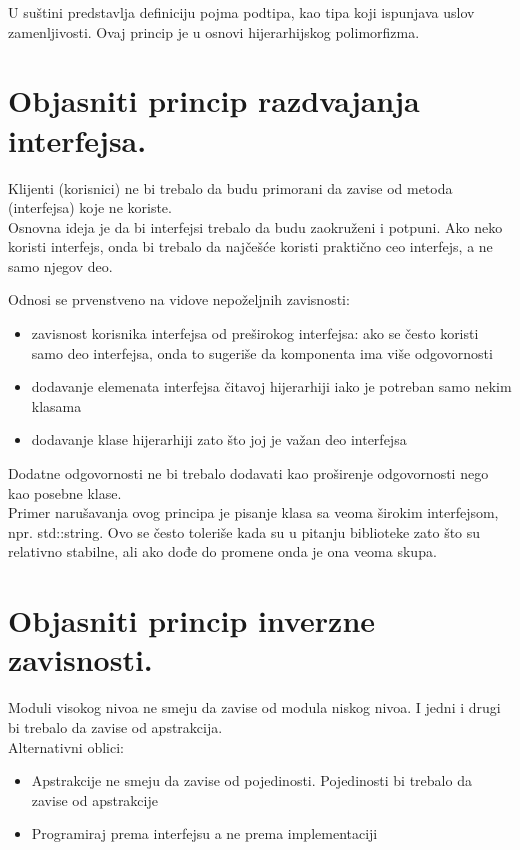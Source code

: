\documentclass[a4paper]{article}
\begin{document}
U suštini predstavlja definiciju pojma podtipa, kao tipa koji ispunjava uslov zamenljivosti. Ovaj princip je u osnovi hijerarhijskog polimorfizma.

\section{Objasniti princip razdvajanja interfejsa.}
Klijenti (korisnici) ne bi trebalo da budu primorani da zavise od metoda (interfejsa) koje ne koriste.\\

Osnovna ideja je da bi interfejsi trebalo da budu zaokruženi i potpuni. Ako neko koristi interfejs, onda bi trebalo da najčešće koristi praktično ceo interfejs, a ne samo njegov deo.

Odnosi se prvenstveno na vidove nepoželjnih zavisnosti:
\begin{itemize}
   \item zavisnost korisnika interfejsa od preširokog interfejsa: ako se često koristi samo deo interfejsa, onda to sugeriše da komponenta ima više odgovornosti
   \item dodavanje elemenata interfejsa čitavoj hijerarhiji iako je potreban samo nekim klasama
   \item dodavanje klase hijerarhiji zato što joj je važan deo interfejsa\\
\end{itemize}
   
Dodatne odgovornosti ne bi trebalo dodavati kao proširenje odgovornosti nego kao posebne klase.\\

Primer narušavanja ovog principa je pisanje klasa sa veoma širokim interfejsom, npr. std::string. Ovo se često toleriše kada su u pitanju biblioteke zato što su relativno stabilne, ali ako dođe do promene onda je ona veoma skupa.

\section{Objasniti princip inverzne zavisnosti.}

Moduli visokog nivoa ne smeju da zavise od modula niskog nivoa. I jedni i drugi bi trebalo da zavise od apstrakcija.\\

Alternativni oblici:
\begin{itemize}
    \item Apstrakcije ne smeju da zavise od pojedinosti. Pojedinosti bi trebalo da zavise od apstrakcije
    \item Programiraj prema interfejsu a ne prema implementaciji\\
\end{itemize}
    
\end{document}
